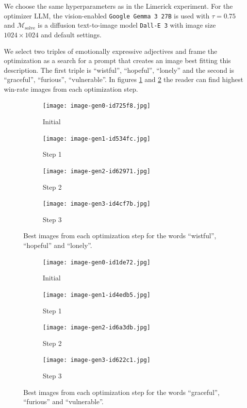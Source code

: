 We choose the same hyperparameters as in the Limerick experiment. For the optimizer LLM, the vision-enabled \texttt{Google Gemma 3 27B} is used with $\tau = 0.75$ and 
$\mathscr{M}_{\text{solve}}$ is a diffusion text-to-image model \texttt{Dall-E 3} with image size $1024\times1024$ and default settings.

We select two triples of emotionally expressive adjectives and frame the optimization as a search for a prompt that creates an image best fitting this description. 
The first triple is ``wistful'', ``hopeful'', ``lonely'' and the second is ``graceful'', ``furious'', ``vulnerable''. In figures \ref{fig:wistful} and \ref{fig:graceful} the reader can find
highest win-rate images from each optimization step.


\begin{figure}[htbp]
    \centering

    \begin{subfigure}{0.24\linewidth}
        \texttt{[image: image-gen0-id725f8.jpg]}
        \caption{Initial}
    \end{subfigure}
    \hfill
    \begin{subfigure}{0.24\linewidth}
        \texttt{[image: image-gen1-id534fc.jpg]}
        \caption{Step 1}
    \end{subfigure}
    \hfill
    \begin{subfigure}{0.24\linewidth}
        \texttt{[image: image-gen2-id62971.jpg]}
        \caption{Step 2}
    \end{subfigure}
    \hfill
    \begin{subfigure}{0.24\linewidth}
        \texttt{[image: image-gen3-id4cf7b.jpg]}
        \caption{Step 3}
    \end{subfigure}

    \caption{Best images from each optimization step for the words ``wistful'', ``hopeful'' and ``lonely''.}
    \label{fig:wistful}
\end{figure}

\begin{figure}[htbp]
    \centering

    \begin{subfigure}{0.24\linewidth}
        \texttt{[image: image-gen0-id1de72.jpg]}
        \caption{Initial}
    \end{subfigure}
    \hfill
    \begin{subfigure}{0.24\linewidth}
        \texttt{[image: image-gen1-id4edb5.jpg]}
        \caption{Step 1}
    \end{subfigure}
    \hfill
    \begin{subfigure}{0.24\linewidth}
        \texttt{[image: image-gen2-id6a3db.jpg]}
        \caption{Step 2}
    \end{subfigure}
    \hfill
    \begin{subfigure}{0.24\linewidth}
        \texttt{[image: image-gen3-id622c1.jpg]}
        \caption{Step 3}
    \end{subfigure}

    \caption{Best images from each optimization step for the words ``graceful'', ``furious'' and ``vulnerable''.}
    \label{fig:graceful}
\end{figure}

